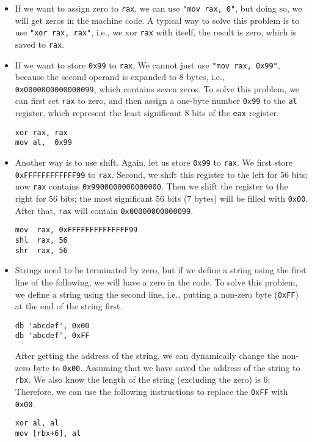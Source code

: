 \begin{itemize}
\item If we want to assign zero to \texttt{rax}, we 
can use \texttt{"mov rax, 0"}, but doing so,
we will get zeros in the machine code. 
A typical way to solve this problem is to 
use \texttt{"xor rax, rax"}, i.e., we xor
\texttt{rax} with itself, the result is zero,
which is saved to \texttt{rax}. 

\item If we want to store \texttt{0x99} to
\texttt{rax}. We cannot just use \texttt{"mov rax, 0x99"}, because 
the second operand is expanded to 8 bytes, i.e., \texttt{0x0000000000000099}, 
which contains seven zeros. 
To solve this problem, we can first set \texttt{rax} to zero, and then
assign a one-byte number \texttt{0x99} to the \texttt{al} register, which 
represent the least significant 8 bits of the \texttt{eax} register. 

\begin{lstlisting}
xor rax, rax
mov al,  0x99
\end{lstlisting}
 

\item Another way is to use shift. 
Again, let us store \texttt{0x99} to \texttt{rax}.
We first store \texttt{0xFFFFFFFFFFFF99} to \texttt{rax}.
Second, we shift this register to the left for 56 bits; 
now \texttt{rax} contains \texttt{0x9900000000000000}.  
Then we shift the register to the right for 56 bits;
the most significant 56 bits (7 bytes) will be filled with \texttt{0x00}. 
After that, \texttt{rax} will contain \texttt{0x00000000000099}. 

\begin{lstlisting}
mov  rax, 0xFFFFFFFFFFFFFF99
shl  rax, 56
shr  rax, 56
\end{lstlisting}


\item Strings need to be terminated by zero, but if we define a string
using the first line of the following, we will have a zero in the code. 
To solve this problem, we define a string using the second line, i.e.,
putting a non-zero byte (\texttt{0xFF}) at the end of the string first.  

\begin{lstlisting}
db 'abcdef', 0x00 
db 'abcdef', 0xFF 
\end{lstlisting}
 
After getting the address of the string, we can dynamically change
the non-zero byte to \texttt{0x00}. Assuming 
that we have saved the address of the string to \texttt{rbx}.
We also know the length of the string (excluding the zero) is 6; 
Therefore, we can use the following instructions to 
replace the \texttt{0xFF} with \texttt{0x00}.   

\begin{lstlisting}
xor al, al
mov [rbx+6], al
\end{lstlisting}
 
\end{itemize}







